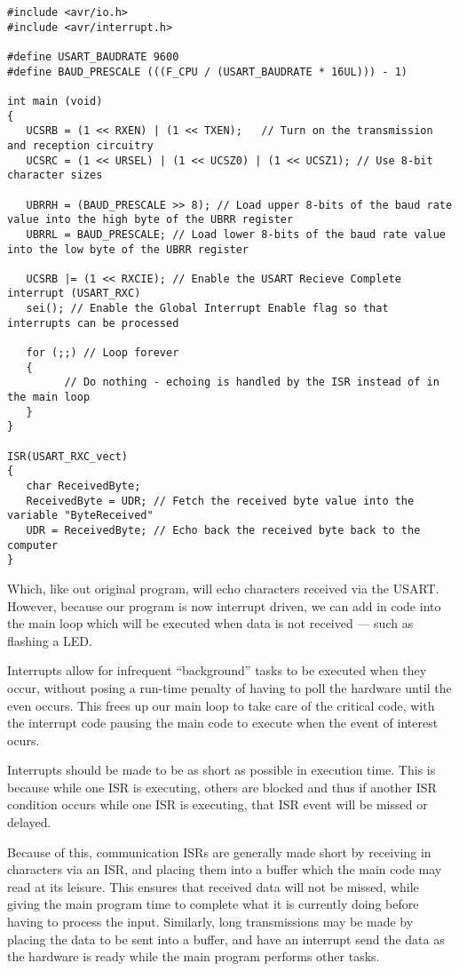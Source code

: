 \documentclass[a4paper,oneside,notitlepage]{book}
\begin{document}
\begin{center}
\begin{lstlisting}
#include <avr/io.h>
#include <avr/interrupt.h>

#define USART_BAUDRATE 9600
#define BAUD_PRESCALE (((F_CPU / (USART_BAUDRATE * 16UL))) - 1)

int main (void)
{
   UCSRB = (1 << RXEN) | (1 << TXEN);   // Turn on the transmission and reception circuitry
   UCSRC = (1 << URSEL) | (1 << UCSZ0) | (1 << UCSZ1); // Use 8-bit character sizes

   UBRRH = (BAUD_PRESCALE >> 8); // Load upper 8-bits of the baud rate value into the high byte of the UBRR register
   UBRRL = BAUD_PRESCALE; // Load lower 8-bits of the baud rate value into the low byte of the UBRR register

   UCSRB |= (1 << RXCIE); // Enable the USART Recieve Complete interrupt (USART_RXC)
   sei(); // Enable the Global Interrupt Enable flag so that interrupts can be processed

   for (;;) // Loop forever
   {
         // Do nothing - echoing is handled by the ISR instead of in the main loop
   }
}

ISR(USART_RXC_vect)
{
   char ReceivedByte;
   ReceivedByte = UDR; // Fetch the received byte value into the variable "ByteReceived"
   UDR = ReceivedByte; // Echo back the received byte back to the computer
}
\end{lstlisting}
\end{center}

Which, like out original program, will echo characters received via the USART. However, because our program is now interrupt driven, we can add in code into the main loop which will be executed when data is not received --- such as flashing a LED.

Interrupts allow for infrequent ``background'' tasks to be executed when they occur, without posing a run-time penalty of having to poll the hardware until the even occurs. This frees up our main loop to take care of the critical code, with the interrupt code pausing the main code to execute when the event of interest ocurs.

Interrupts should be made to be as short as possible in execution time. This is because while one ISR is executing, others are blocked and thus if another ISR condition occurs while one ISR is executing, that ISR event will be missed or delayed.

Because of this, communication ISRs are generally made short by receiving in characters via an ISR, and placing them into a buffer which the main code may read at its leisure. This ensures that received data will not be missed, while giving the main program time to complete what it is currently doing before having to process the input. Similarly, long transmissions may be made by placing the data to be sent into a buffer, and have an interrupt send the data as the hardware is ready while the main program performs other tasks.
\end{document}
